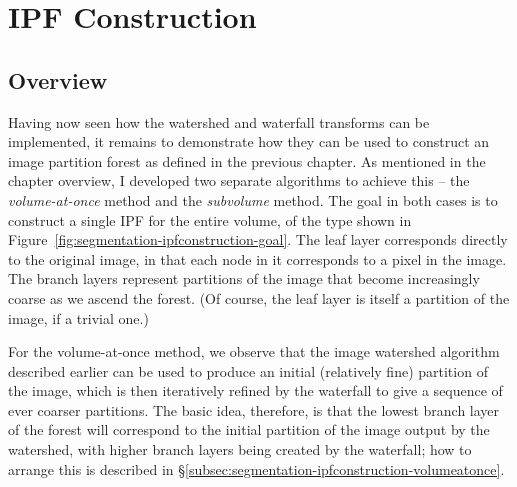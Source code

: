 
\clearpage

\section{IPF Construction}
\label{sec:segmentation-ipfconstruction}


\subsection{Overview}

Having now seen how the watershed and waterfall transforms can be implemented, it remains to demonstrate how they can be used to construct an image partition forest as defined in the previous chapter. As mentioned in the chapter overview, I developed two separate algorithms to achieve this -- the \emph{volume-at-once} method and the \emph{subvolume} method. The goal in both cases is to construct a single IPF for the entire volume, of the type shown in Figure~\ref{fig:segmentation-ipfconstruction-goal}. The leaf layer corresponds directly to the original image, in that each node in it corresponds to a pixel in the image. The branch layers represent partitions of the image that become increasingly coarse as we ascend the forest. (Of course, the leaf layer is itself a partition of the image, if a trivial one.)


For the volume-at-once method, we observe that the image watershed algorithm described earlier can be used to produce an initial (relatively fine) partition of the image, which is then iteratively refined by the waterfall to give a sequence of ever coarser partitions. The basic idea, therefore, is that the lowest branch layer of the forest will correspond to the initial partition of the image output by the watershed, with higher branch layers being created by the waterfall; how to arrange this is described in \S\ref{subsec:segmentation-ipfconstruction-volumeatonce}.

